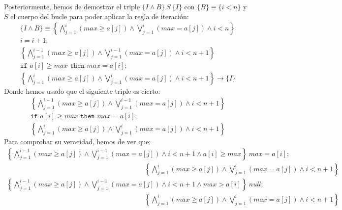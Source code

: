 \begin{ejercicio}
    Posteriormente, hemos de demostrar el triple $\{I \land B\}\ S\ \{I\}$ con $\{B\} \equiv \{i < n\}$ y $S$ el cuerpo del bucle para poder aplicar la regla de iteración:
    \begin{gather*}
        \{I \land B\} \equiv \left\{\bigwedge_{j=1}^{i} (max \geq a[j]) \land \bigvee_{j=1}^{i} (max = a[j]) \land i < n\right\} \\
        i = i + 1; \\
        \left\{\bigwedge_{j=1}^{i-1} (max \geq a[j]) \land \bigvee_{j=1}^{i-1} (max = a[j]) \land i < n+1\right\} \\
        \texttt{if\ } a[i] \geq max \texttt{\ then\ } max = a[i]; \\
        \left\{\bigwedge_{j=1}^{i} (max \geq a[j]) \land \bigvee_{j=1}^{i} (max = a[j]) \land i < n+1\right\} \rightarrow \{I\}
    \end{gather*}
    Donde hemos usado que el siguiente triple es cierto:
    \begin{gather*}
        \left\{\bigwedge_{j=1}^{i-1} (max \geq a[j]) \land \bigvee_{j=1}^{i-1} (max = a[j]) \land i < n+1\right\} \\
        \texttt{if\ } a[i] \geq max \texttt{\ then\ } max = a[i]; \\
        \left\{\bigwedge_{j=1}^{i} (max \geq a[j]) \land \bigvee_{j=1}^{i} (max = a[j]) \land i < n+1\right\}
    \end{gather*}
    Para comprobar su veracidad, hemos de ver que:
    \begin{gather*}
    \left\{\bigwedge_{j=1}^{i-1} (max \geq a[j]) \land \bigvee_{j=1}^{i-1} (max = a[j]) \land i < n+1 \land a[i] \geq max\right\}\ max = a[i];\ \\\hspace{20em}\left\{\bigwedge_{j=1}^{i} (max \geq a[j]) \land \bigvee_{j=1}^{i} (max = a[j]) \land i < n+1\right\} \\
    \left\{\bigwedge_{j=1}^{i-1} (max \geq a[j]) \land \bigvee_{j=1}^{i-1} (max = a[j]) \land i < n+1 \land max > a[i]\right\}\ null;\ \\\hspace{20em}\left\{\bigwedge_{j=1}^{i} (max \geq a[j]) \land \bigvee_{j=1}^{i} (max = a[j]) \land i < n+1\right\}
    \end{gather*}


\end{ejercicio}
